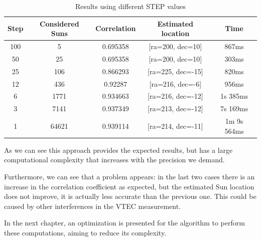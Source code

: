 \begin{table}[h!]
	\centering
	\def\arraystretch{1.2}
	\begin{tabular}{|c c c c c|} 
		\hline
		Step & Considered Suns & Correlation & Estimated location & Time \\ [0.5ex] 
		\hline\hline
		100 & 5 & 0.695358 & [ra=200, dec=10] & 867ms \\
		\hline 
		50 & 25 & 0.695358 & [ra=200, dec=10] & 303ms \\
			\hline 
		25 & 106 & 0.866293 & [ra=225, dec=-15] & 820ms \\
			\hline 
		12 & 436 & 0.92287 & [ra=216, dec=-6] & 956ms \\
			\hline 
		6 & 1771 & 0.934663 & [ra=216, dec=-12] & 1s 385ms \\
			\hline 
		3 & 7141 & 0.937349 & [ra=213, dec=-12] & 7s 169ms \\
			\hline 
		1 & 64621 & 0.939114 & [ra=214, dec=-11] & 1m 9s 564ms \\
		\hline 
	\end{tabular}
	\caption{Results using different STEP values}
\end{table}

As we can see this approach provides the expected results, but has a large computational complexity that increases with the precision we demand. 

Furthermore, we can see that a problem appears: in the last two cases there is an increase in the correlation coefficient as expected, but the estimated Sun location does not improve, it is actually less accurate than the previous one. This could be caused by other interferences in the VTEC measurement.

In the next chapter, an optimization is presented for the algorithm to perform these computations, aiming to reduce its complexity.